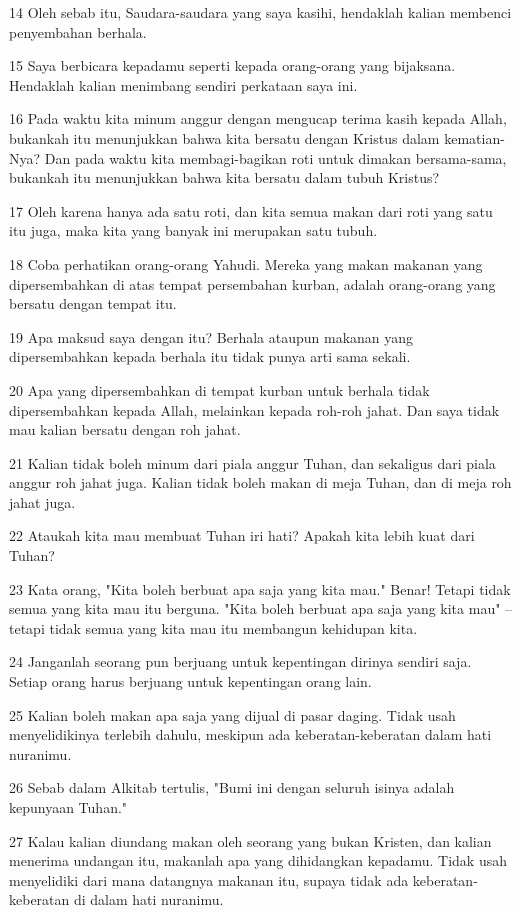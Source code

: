 \par 14 Oleh sebab itu, Saudara-saudara yang saya kasihi, hendaklah kalian membenci penyembahan berhala.
\par 15 Saya berbicara kepadamu seperti kepada orang-orang yang bijaksana. Hendaklah kalian menimbang sendiri perkataan saya ini.
\par 16 Pada waktu kita minum anggur dengan mengucap terima kasih kepada Allah, bukankah itu menunjukkan bahwa kita bersatu dengan Kristus dalam kematian-Nya? Dan pada waktu kita membagi-bagikan roti untuk dimakan bersama-sama, bukankah itu menunjukkan bahwa kita bersatu dalam tubuh Kristus?
\par 17 Oleh karena hanya ada satu roti, dan kita semua makan dari roti yang satu itu juga, maka kita yang banyak ini merupakan satu tubuh.
\par 18 Coba perhatikan orang-orang Yahudi. Mereka yang makan makanan yang dipersembahkan di atas tempat persembahan kurban, adalah orang-orang yang bersatu dengan tempat itu.
\par 19 Apa maksud saya dengan itu? Berhala ataupun makanan yang dipersembahkan kepada berhala itu tidak punya arti sama sekali.
\par 20 Apa yang dipersembahkan di tempat kurban untuk berhala tidak dipersembahkan kepada Allah, melainkan kepada roh-roh jahat. Dan saya tidak mau kalian bersatu dengan roh jahat.
\par 21 Kalian tidak boleh minum dari piala anggur Tuhan, dan sekaligus dari piala anggur roh jahat juga. Kalian tidak boleh makan di meja Tuhan, dan di meja roh jahat juga.
\par 22 Ataukah kita mau membuat Tuhan iri hati? Apakah kita lebih kuat dari Tuhan?
\par 23 Kata orang, "Kita boleh berbuat apa saja yang kita mau." Benar! Tetapi tidak semua yang kita mau itu berguna. "Kita boleh berbuat apa saja yang kita mau" --tetapi tidak semua yang kita mau itu membangun kehidupan kita.
\par 24 Janganlah seorang pun berjuang untuk kepentingan dirinya sendiri saja. Setiap orang harus berjuang untuk kepentingan orang lain.
\par 25 Kalian boleh makan apa saja yang dijual di pasar daging. Tidak usah menyelidikinya terlebih dahulu, meskipun ada keberatan-keberatan dalam hati nuranimu.
\par 26 Sebab dalam Alkitab tertulis, "Bumi ini dengan seluruh isinya adalah kepunyaan Tuhan."
\par 27 Kalau kalian diundang makan oleh seorang yang bukan Kristen, dan kalian menerima undangan itu, makanlah apa yang dihidangkan kepadamu. Tidak usah menyelidiki dari mana datangnya makanan itu, supaya tidak ada keberatan-keberatan di dalam hati nuranimu.
